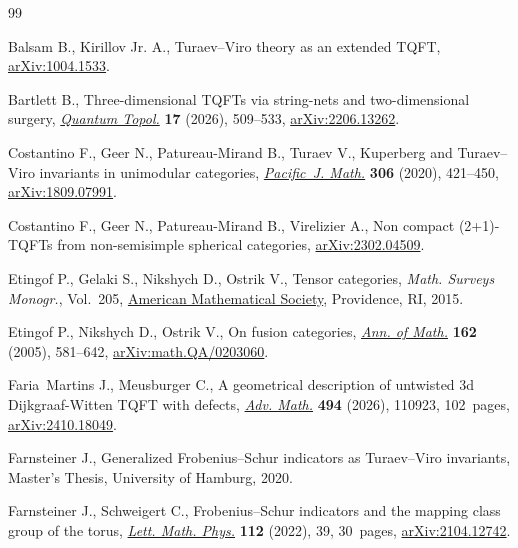 \begin{thebibliography}{99}
\footnotesize\itemsep=0pt

Balsam B., Kirillov Jr. A., Turaev--{V}iro theory as an extended {TQFT},
 \href{http://arxiv.org/abs/1004.1533}{arXiv:1004.1533}.

Bartlett B., Three-dimensional {TQFT}s via string-nets and two-dimensional
 surgery, \href{https://doi.org/10.4171/qt/260}{\textit{Quantum Topol.}}
 \textbf{17} (2026), 509--533,
 \href{http://arxiv.org/abs/2206.13262}{arXiv:2206.13262}.

Costantino F., Geer N., Patureau-Mirand B., Turaev V., Kuperberg and
 {T}uraev--{V}iro invariants in unimodular categories,
 \href{https://doi.org/10.2140/pjm.2020.306.421}{\textit{Pacific~J. Math.}}
 \textbf{306} (2020), 421--450,
 \href{http://arxiv.org/abs/1809.07991}{arXiv:1809.07991}.

Costantino F., Geer N., Patureau-Mirand B., Virelizier A., Non compact
 (2+1)-{TQFT}s from non-semisimple spherical categories,
 \href{http://arxiv.org/abs/2302.04509}{arXiv:2302.04509}.

Etingof P., Gelaki S., Nikshych D., Ostrik V., Tensor categories, \textit{Math.
 Surveys Monogr.}, Vol.~205, \href{https://doi.org/10.1090/surv/205}{American
 Mathematical Society}, Providence, RI, 2015.

Etingof P., Nikshych D., Ostrik V., On fusion categories,
 \href{https://doi.org/10.4007/annals.2005.162.581}{\textit{Ann. of Math.}}
 \textbf{162} (2005), 581--642,
 \href{http://arxiv.org/abs/math.QA/0203060}{arXiv:math.QA/0203060}.

Faria~Martins J., Meusburger C., A geometrical description of untwisted 3d
 {D}ijkgraaf-{W}itten {TQFT} with defects,
 \href{https://doi.org/10.1016/j.aim.2026.110923}{\textit{Adv. Math.}}
 \textbf{494} (2026), 110923, 102~pages,
 \href{http://arxiv.org/abs/2410.18049}{arXiv:2410.18049}.

Farnsteiner J., Generalized {F}robenius--{S}chur indicators as {T}uraev--{V}iro
 invariants, {M}aster's {T}hesis, University of Hamburg, 2020.

Farnsteiner J., Schweigert C., Frobenius--{S}chur indicators and the mapping
 class group of the torus,
 \href{https://doi.org/10.1007/s11005-022-01513-6}{\textit{Lett. Math. Phys.}}
 \textbf{112} (2022), 39, 30~pages,
 \href{http://arxiv.org/abs/2104.12742}{arXiv:2104.12742}.


\end{thebibliography}
